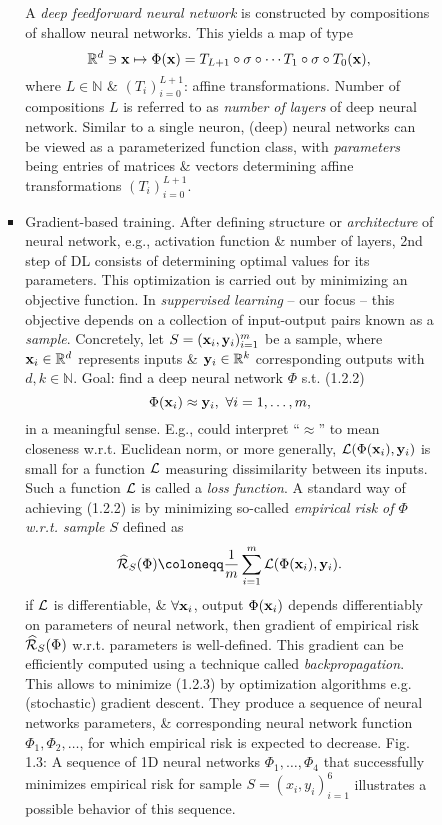 \documentclass{article}
\begin{document}
\begin{enumerate}
\begin{itemize}
\begin{itemize}
\begin{itemize}
				A {\it deep feedforward neural network} is constructed by compositions of shallow neural networks. This yields a map of type
				\begin{equation}
					\label{deep feedforward neural network}
					\mathbb{R}^d\ni{\bf x}\mapsto\Phi({\bf x}) = T_{L+1}\circ\sigma\circ\cdots T_1\circ\sigma\circ T_0({\bf x}),
				\end{equation}
				where $L\in\mathbb{N}$ \& $(T_i)_{i=0}^{L+1}$: affine transformations. Number of compositions $L$ is referred to as {\it number of layers} of deep neural network. Similar to a single neuron, (deep) neural networks can be viewed as a parameterized function class, with {\it parameters} being entries of matrices \& vectors determining affine transformations $(T_i)_{i=0}^{L+1}$.
				\item {\sf Gradient-based training.} After defining structure or {\it architecture} of neural network, e.g., activation function \& number of layers, 2nd step of DL consists of determining optimal values for its parameters. This optimization is carried out by minimizing an objective function. In {\it suppervised learning} -- our focus -- this objective depends on a collection of input-output pairs known as a {\it sample}. Concretely, let $S = ({\bf x}_i,{\bf y}_i)_{i=1}^m$ be a sample, where ${\bf x}_i\in\mathbb{R}^d$ represents inputs \& ${\bf y}_i\in\mathbb{R}^k$ corresponding outputs with $d,k\in\mathbb{N}$. Goal: find a deep neural network $\Phi$ s.t. (1.2.2)
				\begin{equation}
					\Phi({\bf x}_i)\approx{\bf y}_i,\ \forall i = 1,\ldots,m,
				\end{equation}
				in a meaningful sense. E.g., could interpret ``$\approx$'' to mean closeness w.r.t. Euclidean norm, or more generally, ${\cal L}(\Phi({\bf x}_i),{\bf y}_i)$ is small for a function ${\cal L}$ measuring dissimilarity between its inputs. Such a function ${\cal L}$ is called a {\it loss function}. A standard way of achieving (1.2.2) is by minimizing so-called {\it empirical risk of $\Phi$ w.r.t. sample $S$} defined as
				\begin{equation}
					\label{empirical risk}
					\widehat{\cal R}_S(\Phi)\coloneqq\frac{1}{m}\sum_{i=1}^m {\cal L}(\Phi({\bf x}_i),{\bf y}_i).
				\end{equation}
				if ${\cal L}$ is differentiable, \& $\forall{\bf x}_i$, output $\Phi({\bf x}_i)$ depends differentiably on parameters of neural network, then gradient of empirical risk $\widehat{\cal R}_S(\Phi)$ w.r.t. parameters is well-defined. This gradient can be efficiently computed using a technique called {\it backpropagation}. This allows to minimize (1.2.3) by optimization algorithms e.g. (stochastic) gradient descent. They produce a sequence of neural networks parameters, \& corresponding neural network function $\Phi_1,\Phi_2,\ldots$, for which empirical risk is expected to decrease. {\sf Fig. 1.3: A sequence of 1D neural networks $\Phi_1,\ldots,\Phi_4$ that successfully minimizes empirical risk for sample $S = (x_i,y_i)_{i=1}^6$} illustrates a possible behavior of this sequence.

\end{itemize}
\end{itemize}
\end{itemize}
\end{enumerate}
\end{document}
